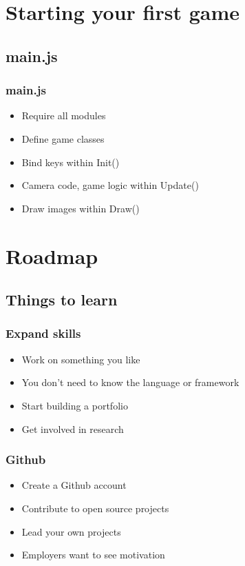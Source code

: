 \documentclass[red]{beamer}
\begin{document}
\section{Starting your first game}
\subsection{main.js}
\begin{frame}
    \frametitle{main.js}
    \begin{itemize}
        \item<1-> Require all modules
        \item<2-> Define game classes
        \item<3-> Bind keys within Init()
        \item<4-> Camera code, game logic within Update()
        \item<5-> Draw images within Draw()
    \end{itemize}
\end{frame}

\section{Roadmap}
\subsection{Things to learn}
\begin{frame}
    \frametitle{Expand skills}
    \begin{itemize}
    \item<1-> Work on something you like
    \item<2-> You don't need to know the language or framework
    \item<3-> Start building a portfolio
    \item<4-> Get involved in research
    \end{itemize}
\end{frame}

\begin{frame}
    \frametitle{Github}
    \begin{itemize}
    \item<1-> Create a Github account
    \item<2-> Contribute to open source projects
    \item<3-> Lead your own projects
    \item<4-> Employers want to see motivation
    \end{itemize}
\end{frame}
\end{document}
